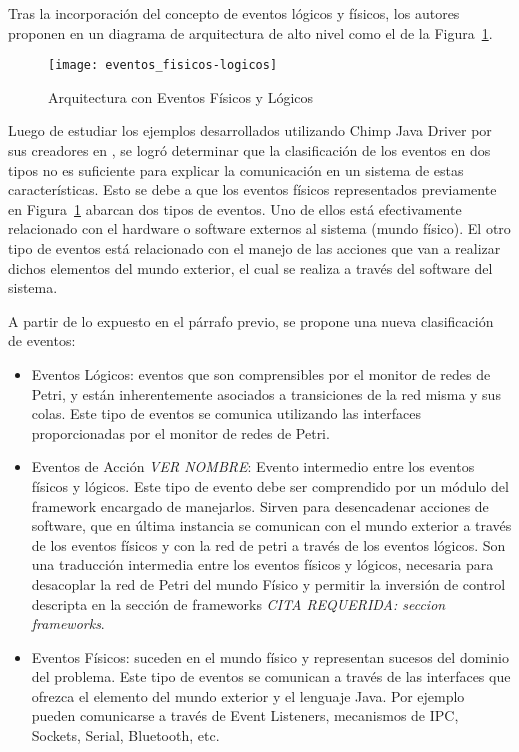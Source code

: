 Tras la incorporación del concepto de eventos lógicos y físicos, los autores
proponen en \cite{chimp} un diagrama de arquitectura de alto nivel como el de
la Figura~\ref{fig:eventos_fisicos-logicos}.

\begin{figure}[h]
	\centering
	\texttt{[image: eventos\_fisicos-logicos]}
	\caption{Arquitectura con Eventos Físicos y Lógicos}
	\label{fig:eventos_fisicos-logicos}
\end{figure}

Luego de estudiar los ejemplos desarrollados utilizando Chimp Java Driver por
sus creadores en \cite{chimp}, se logró determinar que la clasificación de los
eventos en dos tipos no es suficiente para explicar la comunicación en un
sistema de estas características. Esto se debe a que los eventos físicos
representados previamente en Figura~\ref{fig:eventos_fisicos-logicos} abarcan dos
tipos de eventos. Uno de ellos está efectivamente relacionado con el hardware o
software externos al sistema (mundo físico). El otro tipo de eventos está
relacionado con el manejo de las acciones que van a realizar dichos elementos
del mundo exterior, el cual se realiza a través del software del sistema.

A partir de lo expuesto en el párrafo previo, se propone una nueva clasificación
de eventos:

\begin{itemize}
    \item Eventos Lógicos: eventos que son comprensibles por el monitor de
    redes de Petri, y están inherentemente asociados a transiciones de la red
    misma y sus colas. Este tipo de eventos se comunica utilizando las
    interfaces proporcionadas por el monitor de redes de Petri.
    \item Eventos de Acción \emph{\color{red} VER NOMBRE}: Evento intermedio
    entre los eventos físicos y lógicos. Este tipo de evento debe ser
    comprendido por un módulo del framework encargado de manejarlos. Sirven para
    desencadenar acciones de software, que en última instancia se comunican con
    el mundo exterior a través de los eventos físicos y con la red de petri a
    través de los eventos lógicos. Son una traducción intermedia entre los
    eventos físicos y lógicos, necesaria para desacoplar la red de Petri del
    mundo Físico y permitir la inversión de control descripta en la sección de
    frameworks \emph{\color{red} CITA REQUERIDA: seccion frameworks}.
    \item Eventos Físicos: suceden en el mundo físico y representan sucesos del
    dominio del problema. Este tipo de eventos se comunican a través de las
    interfaces que ofrezca el elemento del mundo exterior y el lenguaje Java.
    Por ejemplo pueden comunicarse a través de Event Listeners, mecanismos
    de IPC, Sockets, Serial, Bluetooth, etc.
\end{itemize}

